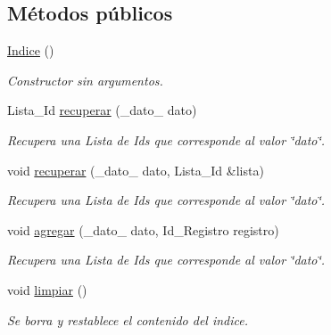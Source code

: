\subsection*{\-Métodos públicos}
\begin{DoxyCompactItemize}
\item 
\hypertarget{classIndice_a82ef9133b088853d57985113629af828}{\hyperlink{classIndice_a82ef9133b088853d57985113629af828}{\-Indice} ()}\label{classIndice_a82ef9133b088853d57985113629af828}

\begin{DoxyCompactList}\small\item\em \-Constructor sin argumentos. \end{DoxyCompactList}\item 
\-Lista\-\_\-\-Id \hyperlink{classIndice_afdf3110afeff5365dba38626271de7b3}{recuperar} (\-\_\-dato\-\_\- dato)
\begin{DoxyCompactList}\small\item\em \-Recupera una \-Lista de \-Ids que corresponde al valor \char`\"{}dato\char`\"{}. \end{DoxyCompactList}\item 
void \hyperlink{classIndice_a03931620413b48005812abce76a8990b}{recuperar} (\-\_\-dato\-\_\- dato, \-Lista\-\_\-\-Id \&lista)
\begin{DoxyCompactList}\small\item\em \-Recupera una \-Lista de \-Ids que corresponde al valor \char`\"{}dato\char`\"{}. \end{DoxyCompactList}\item 
void \hyperlink{classIndice_aedf78836fd9be8256b03409138cb87fd}{agregar} (\-\_\-dato\-\_\- dato, \-Id\-\_\-\-Registro registro)
\begin{DoxyCompactList}\small\item\em \-Recupera una \-Lista de \-Ids que corresponde al valor \char`\"{}dato\char`\"{}. \end{DoxyCompactList}\item 
\hypertarget{classIndice_ad0c1c1247847d11d37615aa00f52e1dd}{void \hyperlink{classIndice_ad0c1c1247847d11d37615aa00f52e1dd}{limpiar} ()}\label{classIndice_ad0c1c1247847d11d37615aa00f52e1dd}

\begin{DoxyCompactList}\small\item\em \-Se borra y restablece el contenido del indice. \end{DoxyCompactList}\end{DoxyCompactItemize}


